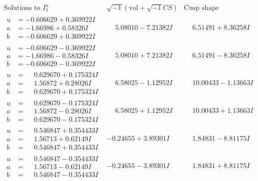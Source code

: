 \documentclass[1p]{elsarticle_modified}
\theoremstyle{definition}
\newcommand{\I}{\sqrt{-1}}
\begin{document}
$$\begin{array}{c|c|c}  
\text{Solutions to }I^u_{1}& \I (\text{vol} + \sqrt{-1}CS) & \text{Cusp shape}\\
 \hline 
\begin{aligned}
u &= -0.606629 + 0.369922 I \\
a &= -1.66986 + 0.58326 I \\
b &= -0.606629 + 0.369922 I\end{aligned}
 & \phantom{-}5.08010 - 7.21382 I & \phantom{-}6.51491 + 8.36258 I \\ \hline\begin{aligned}
u &= -0.606629 - 0.369922 I \\
a &= -1.66986 - 0.58326 I \\
b &= -0.606629 - 0.369922 I\end{aligned}
 & \phantom{-}5.08010 + 7.21382 I & \phantom{-}6.51491 - 8.36258 I \\ \hline\begin{aligned}
u &= \phantom{-}0.629670 + 0.175324 I \\
a &= \phantom{-}1.56872 + 0.28026 I \\
b &= \phantom{-}0.629670 + 0.175324 I\end{aligned}
 & \phantom{-}6.58025 - 1.12952 I & \phantom{-}10.00433 - 1.13663 I \\ \hline\begin{aligned}
u &= \phantom{-}0.629670 - 0.175324 I \\
a &= \phantom{-}1.56872 - 0.28026 I \\
b &= \phantom{-}0.629670 - 0.175324 I\end{aligned}
 & \phantom{-}6.58025 + 1.12952 I & \phantom{-}10.00433 + 1.13663 I \\ \hline\begin{aligned}
u &= \phantom{-}0.546847 + 0.354433 I \\
a &= \phantom{-}1.56713 + 0.62149 I \\
b &= \phantom{-}0.546847 + 0.354433 I\end{aligned}
 & -0.24655 + 3.89301 I & \phantom{-}1.84831 - 8.81175 I \\ \hline\begin{aligned}
u &= \phantom{-}0.546847 - 0.354433 I \\
a &= \phantom{-}1.56713 - 0.62149 I \\
b &= \phantom{-}0.546847 - 0.354433 I\end{aligned}
 & -0.24655 - 3.89301 I & \phantom{-}1.84831 + 8.81175 I \\ \hline\begin{aligned}

\end{aligned}
\end{array}$$
\end{document}
